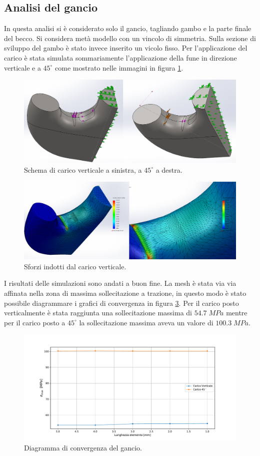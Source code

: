 \subsection{Analisi del gancio}
In questa analisi si è considerato solo il gancio, tagliando gambo e la parte finale del becco. Si considera metà modello con un vincolo di simmetria. 
Sulla sezione di sviluppo del gambo è stato invece inserito un vicolo fisso. 
Per l'applicazione del carico è stata simulata sommariamente l'applicazione della fune in direzione verticale e a $45^{\circ}$ come mostrato nelle immagini in figura \ref{fig:GancioCaricoFin}. 
\begin{figure}[H]
\centering
  \includegraphics[width=.8\textwidth]{imgs/fem/GancioCaricoFin}
\caption{Schema di carico verticale a sinistra, a $45^{\circ}$ a destra.}
\label{fig:GancioCaricoFin}
\end{figure}
\begin{figure}[H]
\centering
  \includegraphics[width=.8\textwidth]{imgs/fem/GancioFeaFinal}
\caption{Sforzi indotti dal carico verticale.}
\label{fig:GancioFeaFinal}
\end{figure}
I risultati delle simulazioni sono andati a buon fine. 
La mesh è stata via via affinata nella zona di massima sollecitazione a trazione, in questo modo è stato possibile diagrammare i grafici di convergenza in figura \ref{fig:Gancio}. 
Per il carico posto verticalmente è stata raggiunta una sollecitazione massima di $54.7 \; MPa$ mentre per il carico posto a $45^{\circ}$ la sollecitazione massima aveva un valore di $100.3\; MPa$.
\begin{figure}[H]
\centering
  \includegraphics[width=.6\textwidth]{imgs/fem/Gancio}
\caption{Diagramma di convergenza del gancio.}
\label{fig:Gancio}
\end{figure}

